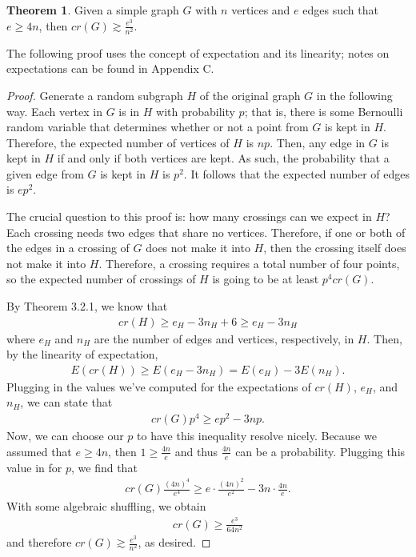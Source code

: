 \documentclass{scrippsthesisclass}
\theoremstyle{definition}
\newtheorem{theorem}{Theorem}[section]
\begin{document}
\begin{theorem}
    Given a simple graph $G$ with $n$ vertices and $e$ edges such that $e \geq 4n$, then $cr(G) \gtrsim \frac{e^3}{n^2}$.
\end{theorem}
The following proof uses the concept of expectation and its linearity; notes on expectations can be found in Appendix C. 
\begin{proof}
    Generate a random subgraph $H$ of the original graph $G$ in the following way. 
    Each vertex in $G$ is in $H$ with probability $p$; that is, there is some Bernoulli random variable that determines whether or not a point from $G$ is kept in $H$.
    Therefore, the expected number of vertices of $H$ is $np$.
    Then, any edge in $G$ is kept in $H$ if and only if both vertices are kept. 
    As such, the probability that a given edge from $G$ is kept in $H$ is $p^2$.
    It follows that the expected number of edges is $ep^2$. 

    The crucial question to this proof is: how many crossings can we expect in $H$? 
    Each crossing needs two edges that share no vertices. 
    Therefore, if one or both of the edges in a crossing of $G$ does not make it into $H$, then the crossing itself does not make it into $H$. 
    Therefore, a crossing requires a total number of four points, so the expected number of crossings of $H$ is going to be at least $p^4 cr(G)$. 
    
    By Theorem 3.2.1, we know that 
    \begin{align}
        cr(H) \geq e_H - 3n_H + 6 \geq e_H - 3n_H 
    \end{align}  where $e_H$ and $n_H$ are the number of edges and vertices, respectively, in $H$.
    Then, by the linearity of expectation, 
    \begin{align}
        E(cr(H)) \geq E(e_H - 3n_H) = E(e_H) - 3E(n_H). 
    \end{align}
    Plugging in the values we've computed for the expectations of $cr(H)$, $e_H$, and $n_H$, we can state that 
    \begin{align}
        cr(G)p^4 \geq ep^2 - 3np.
    \end{align}
    Now, we can choose our $p$ to have this inequality resolve nicely. 
    Because we assumed that $e \geq 4n$, then $1 \geq \frac{4n}{e}$ and thus $\frac{4n}{e}$ can be a probability. 
    Plugging this value in for $p$, we find that 
    \begin{align}
    cr(G) \frac{(4n)^4}{e^4} \geq e \cdot \frac{(4n)^2}{e^2} - 3n \cdot \frac{4n}{e}. 
    \end{align}
    With some algebraic shuffling, we obtain
    \begin{align}
    cr(G) \geq \frac{e^3}{64n^2}
    \end{align}
    and therefore $cr(G) \gtrsim \frac{e^3}{n^2}$, as desired. 
\end{proof}
\end{document}
